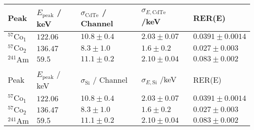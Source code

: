 	\begin{tabular}{|p{2cm}|p{2.5cm}|p{3cm}|p{3cm}|p{3cm}|}
		\hline
		\rowcolor{tabcolor}
		Peak   & $E_\mathrm{peak}$ / keV & $\sigma_\mathrm{CdTe}$ / Channel &             $\sigma_{E, \mathrm{CdTe}}$ /keV & RER(E) \\ 
		\hline
		$^{57}\mathrm{Co}_1$ & $122.06$ & $10.8 \pm 0.4$ & $2.03 \pm 0.07$ & $0.0391 \pm 0.0014$\\ 
		$^{57}\mathrm{Co}_2$ & $136.47$ & $8.3 \pm 1.0$ & $1.6 \pm 0.2$ & $0.027 \pm 0.003$\\ 
		$^{241}\mathrm{Am}$ & $59.5$ & $11.1 \pm 0.2$ & $2.10 \pm 0.04$ & $0.083 \pm 0.002$\\ 
		\hline &&&&\\ 
		\hline
		\rowcolor{tabcolor}
		Peak   & $E_\mathrm{peak}$ / keV & $\sigma_\mathrm{Si}$ / Channel &             $\sigma_{E, \mathrm{Si}}$ /keV & RER(E) \\ 
		\hline
		$^{57}\mathrm{Co}_1$ & $122.06$ & $10.8 \pm 0.4$ & $2.03 \pm 0.07$ & $0.0391 \pm 0.0014$\\ 
		$^{57}\mathrm{Co}_2$ & $136.47$ & $8.3 \pm 1.0$ & $1.6 \pm 0.2$ & $0.027 \pm 0.003$\\ 
		$^{241}\mathrm{Am}$ & $59.5$ & $11.1 \pm 0.2$ & $2.10 \pm 0.04$ & $0.083 \pm 0.002$\\ 
		\hline
	\end{tabular}
